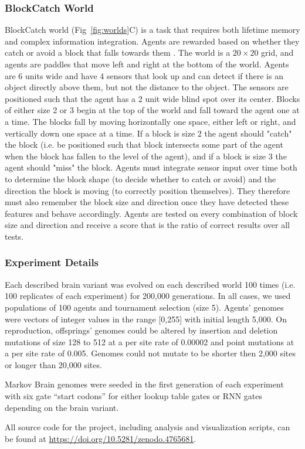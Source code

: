 \subsubsection{BlockCatch World}
BlockCatch world (Fig~\ref{fig:worlds}C) is a task that requires both lifetime memory and complex information integration. 
Agents are rewarded based on whether they catch or avoid a block that falls towards them \citep{marstaller_evolution_2013}. 
The world is a $20 \times 20$ grid, and agents are paddles that move left and right at the bottom of the world. 
Agents are 6 units wide and have 4 sensors that look up and can detect if there is an object directly above them, but not the distance to the object. 
The sensors are positioned such that the agent has a 2 unit wide blind spot over its center. 
Blocks of either size 2 or 3 begin at the top of the world and fall toward the agent one at a time. 
The blocks fall by moving horizontally one space, either left or right, and vertically down one space at a time. 
If a block is size 2 the agent should "catch" the block (i.e. be positioned such that block intersects some part of the agent when the block has fallen to the level of the agent), and if a block is size 3 the agent should "miss" the block. 
Agents must integrate sensor input over time both to determine the block shape (to decide whether to catch or avoid) and the direction the block is moving (to correctly position themselves). 
They therefore must also remember the block size and direction once they have detected these features and behave accordingly. 
Agents are tested on every combination of block size and direction and receive a score that is the ratio of correct results over all tests.

\subsubsection{Experiment Details}
Each described brain variant was evolved on each described world 100 times (i.e. 100 replicates of each experiment) for 200,000 generations.
In all cases, we used populations of 100 agents and tournament selection (size 5). 
Agents' genomes were vectors of integer values in the range [0,255] with initial length 5,000. On reproduction, offsprings' genomes could be altered by insertion and deletion mutations of size 128 to 512 at a per site rate of 0.00002 and point mutations at a per site rate of 0.005. 
Genomes could not mutate to be shorter then 2,000 sites or longer than 20,000 sites.

Markov Brain genomes were seeded in the first generation of each experiment with six gate ``start codons'' for either lookup table gates or RNN gates depending on the brain variant.

All source code for the project, including analysis and visualization scripts, can be found at \url{https://doi.org/10.5281/zenodo.4765681}.